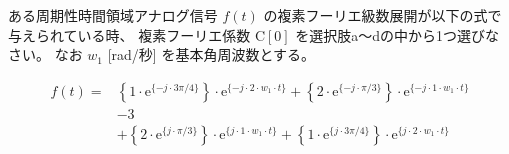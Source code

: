 ある周期性時間領域アナログ信号 $f(t)$ の複素フーリエ級数展開が以下の式で与えられている時、
複素フーリエ係数 $\textrm{C}[0]$ を選択肢a〜dの中から1つ選びなさい。
なお $w_1$ [rad/秒] を基本角周波数とする。

\begin{align*}
f(t) =
&  \left \{ 1 \cdot \textrm{e}^{\{-j \cdot 3\pi/4 \}} \right \} \cdot \textrm{e}^{\{-j \cdot 2 \cdot w_1 \cdot t \}}
 + \left \{ 2 \cdot \textrm{e}^{\{-j \cdot \pi/3 \}} \right \} \cdot \textrm{e}^{\{-j \cdot 1 \cdot w_1 \cdot t \}} \\
&- 3 \\
&+ \left \{ 2 \cdot \textrm{e}^{\{ j \cdot \pi/3 \}} \right \} \cdot \textrm{e}^{\{ j \cdot 1 \cdot w_1 \cdot t \}} 
 + \left \{ 1 \cdot \textrm{e}^{\{ j \cdot 3\pi/4 \}} \right \} \cdot \textrm{e}^{\{ j \cdot 2 \cdot w_1 \cdot t \}} 
\end{align*}
